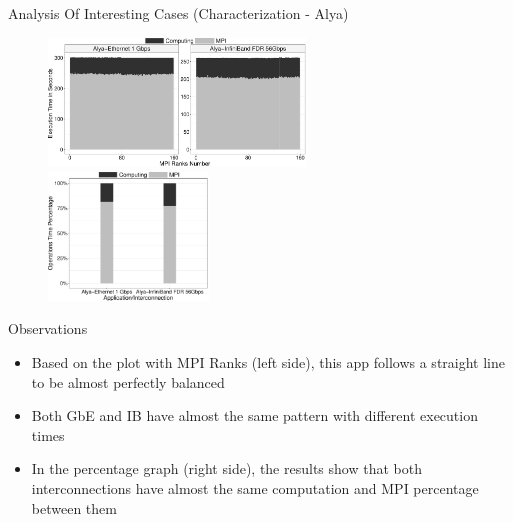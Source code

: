\documentclass{beamer}
\begin{document}
\begin{frame}{Analysis Of Interesting Cases (Characterization - Alya)}
\begin{figure}
   \includegraphics[width=0.61\textwidth]{SLIDES/img/Alya.charac.pdf}
   \includegraphics[width=0.38\textwidth]{SLIDES/img/Alya.percentage.pdf}
\end{figure}
\pause Observations
\begin{itemize}
    \item Based on the plot with MPI Ranks (left side), this app follows a straight line to be \alert{almost perfectly balanced}
    \pause\item Both GbE and IB have almost the \alert{same pattern} with \alert{different execution times}
    \pause\item In the percentage graph (right side), the results show that both interconnections have almost the \alert{same computation and MPI percentage between them}
\end{itemize}
\end{frame}
\end{document}
